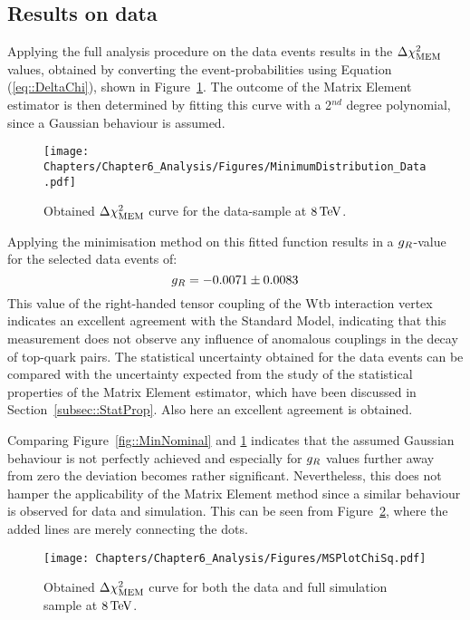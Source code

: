 \subsection{Results on data}
Applying the full analysis procedure on the data events results in the $\Delta \chi^{2}_{\textrm{MEM}}$ values, obtained by converting the event-probabilities using Equation (\ref{eq::DeltaChi}), shown in Figure~\ref{fig::MinData}.
The outcome of the Matrix Element estimator is then determined by fitting this curve with a 2$^{nd}$ degree polynomial, since a Gaussian behaviour is assumed.
\begin{figure}[h!t]
 \centering
 \texttt{[image: Chapters/Chapter6\_Analysis/Figures/MinimumDistribution\_Data.pdf]}
 \caption{Obtained $\Delta \chi^{2}_{\textrm{MEM}}$ curve for the data-sample at $8 \, \mathrm{TeV}$.} \label{fig::MinData}
\end{figure}

Applying the minimisation method on this fitted function results in a $g_{R}$-value for the selected data events of:
\begin{equation} \label{eq::DataResult}
 g_{R} = -0.0071 \pm 0.0083
\end{equation}
This value of the right-handed tensor coupling of the Wtb interaction vertex indicates an excellent agreement with the Standard Model, indicating that this measurement does not observe any influence of anomalous couplings in the decay of top-quark pairs.
The statistical uncertainty obtained for the data events can be compared with the uncertainty expected from the study of the statistical properties of the Matrix Element estimator, which have been discussed in Section~\ref{subsec::StatProp}.
Also here an excellent agreement is obtained.


Comparing Figure~\ref{fig::MinNominal} and \ref{fig::MinData} indicates that the assumed Gaussian behaviour is not perfectly achieved and especially for $g_{R}$ values further away from zero the deviation becomes rather significant.
Nevertheless, this does not hamper the applicability of the Matrix Element method since a similar behaviour is observed for data and simulation. This can be seen from Figure~\ref{fig::MSPlotChiSq}, where the added lines are merely connecting the dots.
\begin{figure}[h!t]
 \centering
 \texttt{[image: Chapters/Chapter6\_Analysis/Figures/MSPlotChiSq.pdf]}
 \caption{Obtained $\Delta \chi^{2}_{\textrm{MEM}}$ curve for both the data and full simulation sample at $8 \, \mathrm{TeV}$.} \label{fig::MSPlotChiSq}
\end{figure}

